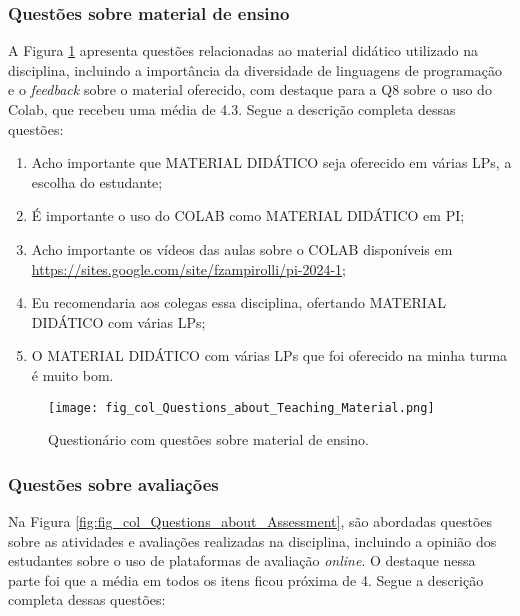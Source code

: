 \subsubsection{Questões sobre material de ensino}

A Figura \ref{fig:fig_col_Questions_about_Teaching_Material} apresenta questões relacionadas ao material didático utilizado na disciplina, incluindo a importância da diversidade de linguagens de programação e o \textit{feedback} sobre o material oferecido, com destaque para a Q8 sobre o uso do Colab, que recebeu uma média de 4.3. Segue a descrição completa dessas questões:

\begin{enumerate}[label=\textbf{Q\arabic*.}, itemsep=0pt, parsep=0pt, topsep=0pt, leftmargin=*, before=\ttfamily, after=\normalfont]
    \fontsize{9}{11}\selectfont
    \setcounter{enumi}{6} %
    \item Acho importante que MATERIAL DIDÁTICO seja oferecido em várias LPs, a escolha do estudante;
    \item É importante o uso do COLAB como MATERIAL DIDÁTICO em PI;
    \item Acho importante os vídeos das aulas sobre o COLAB disponíveis em \url{https://sites.google.com/site/fzampirolli/pi-2024-1};
    \item Eu recomendaria aos colegas essa disciplina, ofertando MATERIAL DIDÁTICO com várias LPs;
    \item O MATERIAL DIDÁTICO com várias LPs que foi oferecido na minha turma é muito bom.
\end{enumerate}

\begin{figure}[!ht]
    \centering
    \texttt{[image: fig\_col\_Questions\_about\_Teaching\_Material.png]}
     \caption{Questionário com questões sobre material de ensino.}
  \label{fig:fig_col_Questions_about_Teaching_Material}
\end{figure}


\subsubsection{Questões sobre avaliações}

Na Figura \ref{fig:fig_col_Questions_about_Assessment}, são abordadas questões sobre as atividades e avaliações realizadas na disciplina, incluindo a opinião dos estudantes sobre o uso de plataformas de avaliação \textit{online}. O destaque nessa parte foi que a média em todos os itens ficou próxima de 4. Segue a descrição completa dessas questões:

